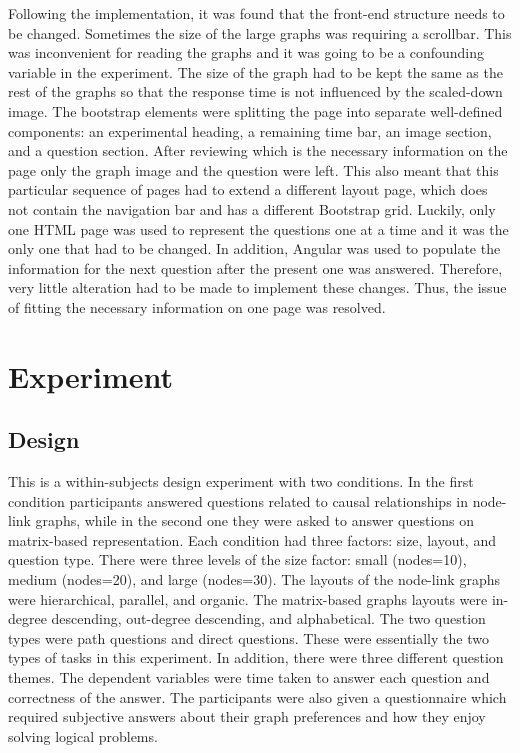 \documentclass{l4proj}
\begin{document}
Following the implementation, it was found that the front-end structure needs to be changed. Sometimes the size of the large graphs was requiring a scrollbar. This was inconvenient for reading the graphs and it was going to be a confounding variable in the experiment. The size of  the graph had to be kept the same as the rest of the graphs so that the response time is not influenced by the scaled-down image. The bootstrap elements were splitting the page into separate well-defined components: an experimental heading, a remaining time bar, an image section, and a question section. After reviewing which is the necessary information on the page only the graph image and the question were left. This also meant that this particular sequence of pages had to extend a different layout page, which does not contain the navigation bar and has a different Bootstrap grid. Luckily, only one HTML page was used to represent the questions one at a time and it was the only one that had to be changed. In addition, Angular was used to populate the information for the next question after the present one was answered. Therefore, very little alteration had to be made to implement these changes. Thus, the issue of fitting the necessary information on one page was resolved.


\chapter{Experiment}
\label{chap:exp}

\section{Design}

This is a within-subjects design experiment with two conditions. In the first condition participants answered questions related to causal relationships in node-link graphs, while in the second one they were asked to answer questions on matrix-based representation. Each condition had three factors: size, layout, and question type. There were three levels of the size factor: small (nodes=10), medium (nodes=20), and large (nodes=30). The layouts of the node-link graphs were hierarchical, parallel, and organic. The matrix-based graphs layouts were in-degree descending, out-degree descending, and alphabetical. The two question types were path questions and direct questions. These were essentially the two types of tasks in this experiment. In addition, there were three different question themes. The dependent variables were time taken to answer each question and correctness of the answer. The participants were also given a questionnaire which required subjective answers about their graph preferences and how they enjoy solving logical problems. 
\end{document}
